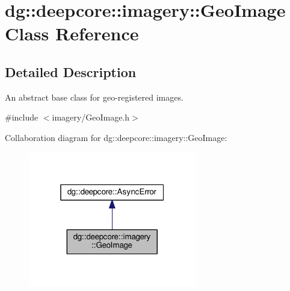 \hypertarget{classdg_1_1deepcore_1_1imagery_1_1_geo_image}{}\section{dg\+:\+:deepcore\+:\+:imagery\+:\+:Geo\+Image Class Reference}
\label{classdg_1_1deepcore_1_1imagery_1_1_geo_image}


\subsection{Detailed Description}
An abstract base class for geo-\/registered images. 

{\ttfamily \#include $<$imagery/\+Geo\+Image.\+h$>$}



Collaboration diagram for dg\+:\+:deepcore\+:\+:imagery\+:\+:Geo\+Image\+:
\nopagebreak
\begin{figure}[H]
\begin{center}
\leavevmode
\includegraphics[width=208pt]{classdg_1_1deepcore_1_1imagery_1_1_geo_image__coll__graph}
\end{center}
\end{figure}
